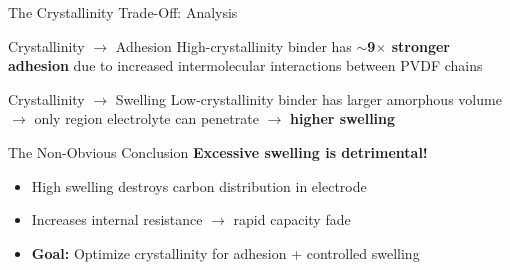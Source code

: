\documentclass[aspectratio=169]{beamer}
\begin{document}
\begin{frame}{The Crystallinity Trade-Off: Analysis}
    \begin{block}{Crystallinity $\rightarrow$ Adhesion}
        High-crystallinity binder has \textbf{$\sim$9$\times$ stronger adhesion} due to increased intermolecular interactions between PVDF chains
    \end{block}
    
    \begin{block}{Crystallinity $\rightarrow$ Swelling}
        Low-crystallinity binder has larger amorphous volume $\rightarrow$ only region electrolyte can penetrate $\rightarrow$ \textbf{higher swelling}
    \end{block}
    
    \begin{alertblock}{The Non-Obvious Conclusion}
        \textbf{Excessive swelling is detrimental!}
        \begin{itemize}
            \item High swelling destroys carbon distribution in electrode
            \item Increases internal resistance $\rightarrow$ rapid capacity fade
            \item \textbf{Goal:} Optimize crystallinity for adhesion + controlled swelling
        \end{itemize}
    \end{alertblock}
\end{frame}
\end{document}
